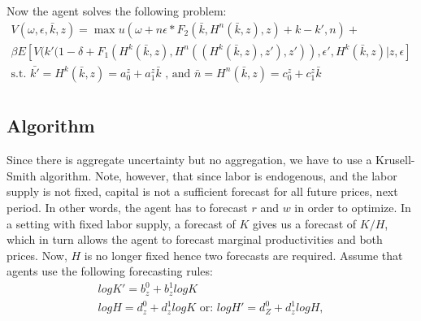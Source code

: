 Now the agent solves the following problem: 
\begin{align}
V(\omega,\epsilon,\bar{k},z) = \max u(\omega + n \epsilon * F_2 (\bar{k},H^n (\bar{k},z),z) + k - k', n)+\\
\beta E [V(k'(1-\delta + F_1 (H^k (\bar{k},z),H^n ((H^k (\bar{k},z),z'),z')),\epsilon',H^k (\bar{k},z)| z,\epsilon] \\
\text{s.t. } \bar{k'} = H^k(\bar{k},z) = a^z_{0} + a^z_{1} \bar{k} \text{ , and } \bar{n}=H^n (\bar{k},z)=c^z_0 + c^z_1 \bar{k}\\ 
\end{align}
\subsection*{Algorithm}
Since  there  is  aggregate  uncertainty  but  no  aggregation,  we  have  to  use  a  Krusell-Smith  algorithm.  Note, however, that since labor is endogenous, and the labor supply is not fixed, capital is not a sufficient forecast for all future prices, next period.  In other words, the agent has to forecast $r$ and $w$ in order to optimize.  In a setting with fixed labor supply, a forecast of $K$ gives us a forecast of $K/H$, which in turn allows the agent to forecast marginal productivities and both prices.  Now, $H$ is no longer fixed hence two forecasts are required.  Assume that agents use the following forecasting rules: 
\begin{align}
log K' = b^0_z + b^1_z log K \\
log H  = d^0_z + d^1_z log K \text{ or: } log H' = d^0_Z + d^1_z log H, 
\end{align}

